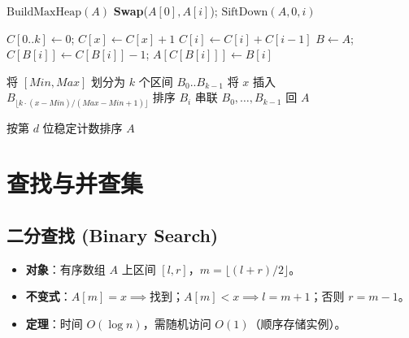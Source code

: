 \begin{algorithm}[H]
\caption{堆排序规约}
\begin{algorithmic}[1]
    \State $\text{BuildMaxHeap}(A)$ 
        \State \textbf{Swap}($A[0],A[i]$); $\text{SiftDown}(A,0,i)$
    \EndFor
\EndProcedure
\end{algorithmic}
\end{algorithm}

\begin{algorithm}[H]
\caption{计数排序规约}
\begin{algorithmic}[1]
    \State $C[0..k]\gets0$;  $C[x]\gets C[x]+1$ \EndFor
     $C[i]\gets C[i]+C[i-1]$ \EndFor
    \State $B\gets A$;  $C[B[i]]\gets C[B[i]]-1$; $A[C[B[i]]]\gets B[i]$ \EndFor
\EndProcedure
\end{algorithmic}
\end{algorithm}

\begin{algorithm}[H]
\caption{桶排序规约}
\begin{algorithmic}[1]
    \State 将 $[Min,Max]$ 划分为 $k$ 个区间 $B_0..B_{k-1}$
     将 $x$ 插入 $B_{\lfloor k\cdot(x-Min)/(Max-Min+1)\rfloor}$ \EndFor
     排序 $B_i$  \EndFor
    \State 串联 $B_0,\dots,B_{k-1}$ 回 $A$
\EndProcedure
\end{algorithmic}
\end{algorithm}

\begin{algorithm}[H]
\caption{基数排序规约}
\begin{algorithmic}[1]
        \State 按第 $d$ 位稳定计数排序 $A$ 
    \EndFor
\EndProcedure
\end{algorithmic}
\end{algorithm}



\newpage

\section{查找与并查集}

\subsection{二分查找 (Binary Search)}
\begin{itemize}
    \item \textbf{对象}：有序数组 $A$ 上区间 $[l,r]$，$m=\lfloor(l+r)/2\rfloor$。
    \item \textbf{不变式}：$A[m]=x\implies$找到；$A[m]<x\implies l=m+1$；否则 $r=m-1$。
    \item \textbf{定理}：时间 $O(\log n)$，需随机访问 $O(1)$（顺序存储实例）。
\end{itemize}


